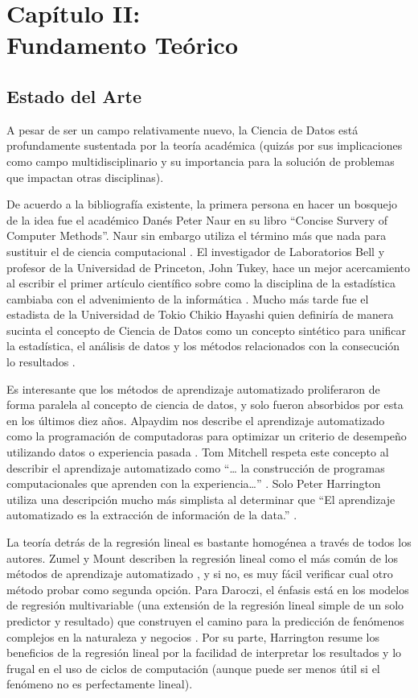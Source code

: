 \setcounter{chapter}{1}
\chapter{Capítulo II: \\Fundamento Teórico}
\thispagestyle{empty}

\section{Estado del Arte}
A pesar de ser un campo relativamente nuevo, la Ciencia de Datos está profundamente sustentada por la teoría académica (quizás por sus implicaciones como campo multidisciplinario y su importancia para la solución de problemas que impactan otras disciplinas).

De acuerdo a la bibliografía existente, la primera persona en hacer un bosquejo de la idea fue el académico Danés Peter Naur en su libro “Concise Survery of Computer Methods”. Naur sin embargo utiliza el término más que nada para sustituir el de ciencia computacional \cite{naur}. El investigador de Laboratorios Bell y profesor de la Universidad de Princeton, John Tukey, hace un mejor acercamiento al escribir el primer artículo científico sobre como la disciplina de la estadística cambiaba con el advenimiento de la informática \cite{tukey}. Mucho más tarde fue el estadista de la Universidad de Tokio Chikio Hayashi quien definiría de manera sucinta el concepto de Ciencia de Datos como un concepto sintético para unificar la estadística, el análisis de datos y los métodos relacionados con la consecución lo resultados \cite{hayashi}.

Es interesante que los métodos de aprendizaje automatizado proliferaron de forma paralela al concepto de ciencia de datos, y solo fueron absorbidos por esta en los últimos diez años. Alpaydim nos describe el aprendizaje automatizado como la programación de computadoras para optimizar un criterio de desempeño utilizando datos o experiencia pasada \cite{alpaydin}. Tom Mitchell respeta este concepto al describir el aprendizaje automatizado como “… la construcción de programas computacionales que aprenden con la experiencia…” \cite[pag. XV]{mitchell}. Solo Peter Harrington utiliza una descripción mucho más simplista al determinar que “El aprendizaje automatizado es la extracción de información de la data.” \cite[pag. 5]{harrington}.

La teoría detrás de la regresión lineal es bastante homogénea a través de todos los autores. Zumel y Mount describen la regresión lineal como el más común de los métodos de aprendizaje automatizado \cite{zumelMount}, y si no, es muy fácil verificar cual otro método probar como segunda opción. Para Daroczi, el énfasis está en los modelos de regresión multivariable (una extensión de la regresión lineal simple de un solo predictor y resultado) que construyen el camino para la predicción de fenómenos complejos en la naturaleza y negocios \cite{daroczi}. Por su parte, Harrington resume los beneficios de la regresión lineal \cite{harrington} por la facilidad de interpretar los resultados y lo frugal en el uso de ciclos de computación (aunque puede ser menos útil si el fenómeno no es perfectamente lineal).

